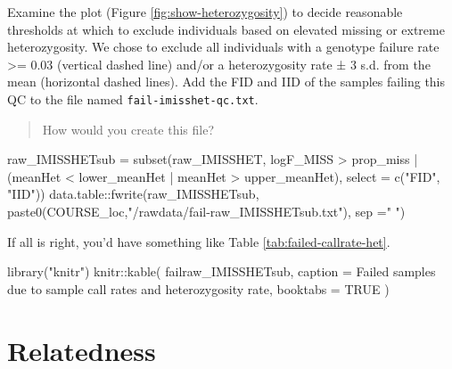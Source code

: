 \documentclass[
]{book}
\newenvironment{Shaded}{\begin{snugshade}}{\end{snugshade}}
\newcommand{\AttributeTok}[1]{\textcolor[rgb]{0.77,0.63,0.00}{#1}}
\newcommand{\ConstantTok}[1]{\textcolor[rgb]{0.00,0.00,0.00}{#1}}
\newcommand{\FunctionTok}[1]{\textcolor[rgb]{0.00,0.00,0.00}{#1}}
\newcommand{\NormalTok}[1]{#1}
\newcommand{\OtherTok}[1]{\textcolor[rgb]{0.56,0.35,0.01}{#1}}
\newcommand{\SpecialCharTok}[1]{\textcolor[rgb]{0.00,0.00,0.00}{#1}}
\newcommand{\StringTok}[1]{\textcolor[rgb]{0.31,0.60,0.02}{#1}}
\begin{document}
Examine the plot (Figure \ref{fig:show-heterozygosity}) to decide reasonable thresholds at which to exclude individuals based on elevated missing or extreme heterozygosity. We chose to exclude all individuals with a genotype failure rate \textgreater= 0.03 (vertical dashed line) and/or a heterozygosity rate ± 3 s.d. from the mean (horizontal dashed lines). Add the FID and IID of the samples failing this QC to the file named \texttt{fail-imisshet-qc.txt}.

\begin{quote}
How would you create this file?
\end{quote}

\begin{Shaded}
\begin{Highlighting}[]
\NormalTok{raw\_IMISSHETsub }\OtherTok{=} \FunctionTok{subset}\NormalTok{(raw\_IMISSHET, logF\_MISS }\SpecialCharTok{\textgreater{}}\NormalTok{ prop\_miss }\SpecialCharTok{|}\NormalTok{ (meanHet }\SpecialCharTok{\textless{}}\NormalTok{ lower\_meanHet }\SpecialCharTok{|}\NormalTok{ meanHet }\SpecialCharTok{\textgreater{}}\NormalTok{ upper\_meanHet),}
                         \AttributeTok{select =} \FunctionTok{c}\NormalTok{(}\StringTok{"FID"}\NormalTok{, }\StringTok{"IID"}\NormalTok{))}
\NormalTok{data.table}\SpecialCharTok{::}\FunctionTok{fwrite}\NormalTok{(raw\_IMISSHETsub, }\FunctionTok{paste0}\NormalTok{(COURSE\_loc,}\StringTok{"/rawdata/fail{-}raw\_IMISSHETsub.txt"}\NormalTok{), }\AttributeTok{sep =}\StringTok{" "}\NormalTok{)}
\end{Highlighting}
\end{Shaded}

If all is right, you'd have something like Table \ref{tab:failed-callrate-het}.

\begin{Shaded}
\begin{Highlighting}[]
\FunctionTok{library}\NormalTok{(}\StringTok{"knitr"}\NormalTok{)}
\NormalTok{knitr}\SpecialCharTok{::}\FunctionTok{kable}\NormalTok{(}
\NormalTok{  failraw\_IMISSHETsub, }\AttributeTok{caption =} \StringTok{\textquotesingle{}Failed samples due to sample call rates and heterozygosity rate\textquotesingle{}}\NormalTok{,}
  \AttributeTok{booktabs =} \ConstantTok{TRUE}
\NormalTok{)}
\end{Highlighting}
\end{Shaded}

\hypertarget{relatedness}{%
\section{Relatedness}\label{relatedness}}
\end{document}
